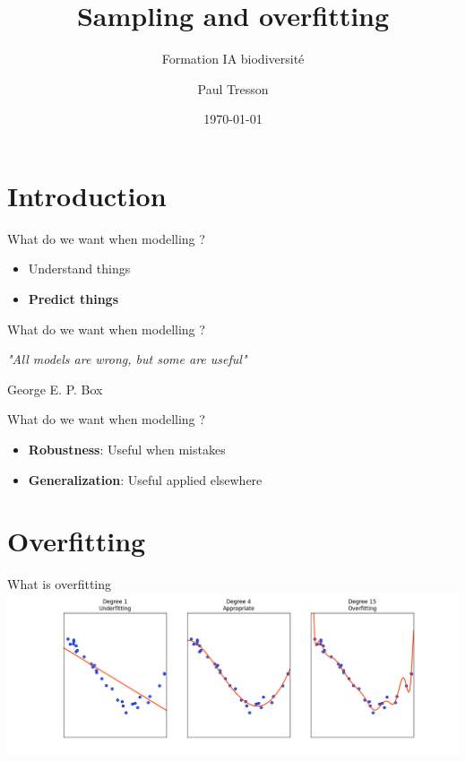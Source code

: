 \documentclass{irdbeamer}
\title{Sampling and overfitting}
\subtitle{Formation IA biodiversité}
\author[Paul Tresson]{Paul Tresson}
\date{\today} %
\institute[Institut de Recherche pour le Développement]{UMR AMAP}
\begin{document}
\maketitle

\usebackgroundtemplate{}

\section{Introduction}

\begin{frame}{What do we want when modelling ?}
    \begin{itemize}
        \item<1-> Understand things
        \item<2-> \textbf{Predict things}
    \end{itemize}
\end{frame}

\begin{frame}{What do we want when modelling ?}
    
    \Large{
    \textit{
        "All models are wrong, but some are useful"
        }
    }

    \hfill George E. P. Box
\end{frame}

\begin{frame}{What do we want when modelling ?}
    \begin{itemize}
        \item \textbf{Robustness}: Useful when mistakes
        \item \textbf{Generalization}: Useful applied elsewhere
    \end{itemize}
\end{frame}

\section{Overfitting}

\begin{frame}{What is overfitting}
    \centering
    \includegraphics[width = .8\textwidth]{./figs/overfitting-overview.png}
\end{frame}
\end{document}
